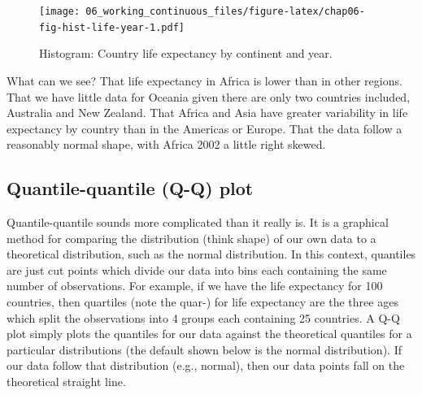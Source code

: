 \documentclass[
  12pt,
  krantz2]{krantz}
\makeatletter
\newenvironment{Shaded}{\begin{snugshade}}{\end{snugshade}}
\newcommand{\CommentTok}[1]{\textcolor[rgb]{0.56,0.35,0.01}{\textit{#1}}}
\newcommand{\DataTypeTok}[1]{\textcolor[rgb]{0.13,0.29,0.53}{#1}}
\newcommand{\DecValTok}[1]{\textcolor[rgb]{0.00,0.00,0.81}{#1}}
\newcommand{\KeywordTok}[1]{\textcolor[rgb]{0.13,0.29,0.53}{\textbf{#1}}}
\newcommand{\NormalTok}[1]{#1}
\newcommand{\OperatorTok}[1]{\textcolor[rgb]{0.81,0.36,0.00}{\textbf{#1}}}
\newcommand{\StringTok}[1]{\textcolor[rgb]{0.31,0.60,0.02}{#1}}
\newenvironment{kframe}{%
\medskip{}
\setlength{\fboxsep}{.8em}
 \def\at@end@of@kframe{}%
 \ifinner\ifhmode%
  \def\at@end@of@kframe{\end{minipage}}%
  \begin{minipage}{\columnwidth}%
 \fi\fi%
 \def\FrameCommand##1{\hskip\@totalleftmargin \hskip-\fboxsep
 \colorbox{shadecolor}{##1}\hskip-\fboxsep
     \hskip-\linewidth \hskip-\@totalleftmargin \hskip\columnwidth}%
 \MakeFramed {\advance\hsize-\width
   \@totalleftmargin\z@ \linewidth\hsize
   \@setminipage}}%
 {\par\unskip\endMakeFramed%
 \at@end@of@kframe}
\renewenvironment{Shaded}{\begin{kframe}}{\end{kframe}}
\makeatother
\begin{document}
\begin{figure}
\centering
\texttt{[image: 06\_working\_continuous\_files/figure-latex/chap06-fig-hist-life-year-1.pdf]}
\caption{\label{fig:chap06-fig-hist-life-year}Histogram: Country life expectancy by continent and year.}
\end{figure}

What can we see?
That life expectancy in Africa is lower than in other regions.
That we have little data for Oceania given there are only two countries included, Australia and New Zealand.
That Africa and Asia have greater variability in life expectancy by country than in the Americas or Europe.
That the data follow a reasonably normal shape, with Africa 2002 a little right skewed.

\hypertarget{chap06-h3-qq-plot}{%
\subsection{Quantile-quantile (Q-Q) plot}\label{chap06-h3-qq-plot}}

Quantile-quantile sounds more complicated than it really is.
It is a graphical method for comparing the distribution (think shape) of our own data to a theoretical distribution, such as the normal distribution.
In this context, quantiles are just cut points which divide our data into bins each containing the same number of observations.
For example, if we have the life expectancy for 100 countries, then quartiles (note the quar-) for life expectancy are the three ages which split the observations into 4 groups each containing 25 countries.
A Q-Q plot simply plots the quantiles for our data against the theoretical quantiles for a particular distributions (the default shown below is the normal distribution).
If our data follow that distribution (e.g., normal), then our data points fall on the theoretical straight line.

\begin{Shaded}
\end{Shaded}
\end{document}
